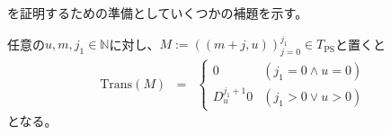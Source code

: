 \documentclass[dvipdfmx,uplatex]{jsarticle}
\theoremstyle{customnonumberbreakfortheorem}
\theoremstyle{customnonumberbreakforproof}
\begin{document}
を証明するための準備としていくつかの補題を示す。

\begin{lemma}\label{公差(1,0)のペア数列のTransの基本性質}
	任意の\(u,m,j_1 \in \mathbb{N}\)に対し、\(M := ((m+j,u))_{j=0}^{j_1} \in T_{\textrm{PS}}\)と置くと
	\begin{eqnarray*}
	\textrm{Trans}(M) & = & \left\{ \begin{array}{ll} 0 & (j_1 = 0 \wedge u = 0) \\ D_u^{j_1+1} 0 & (j_1 > 0 \vee u > 0) \end{array} \right.
	\end{eqnarray*}
	となる。
\end{lemma}
\end{document}
